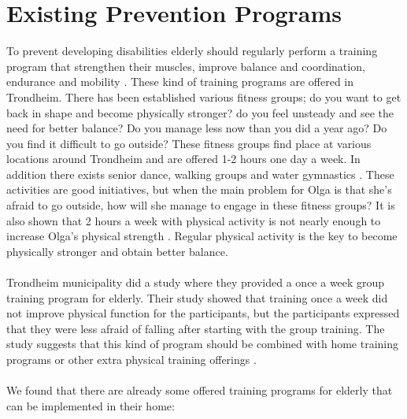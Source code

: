 \section{Existing Prevention Programs}
To prevent developing disabilities elderly should regularly perform a training program that strengthen their muscles, improve balance and coordination, endurance and mobility \cite{gruppetrening-trheim}. These kind of training programs are offered in Trondheim. There has been established various fitness groups; do you want to get back in shape and become physically stronger? do you feel unsteady and see the need for better balance? Do you manage less now than you did a year ago? Do you find it difficult to go outside? These fitness groups find place at various locations around Trondheim and are offered 1-2 hours one day a week. In addition there exists senior dance, walking groups and water gymnastics \cite{trim}. These activities are good initiatives, but when the main problem for Olga is that she's afraid to go outside, how will she manage to engage in these fitness groups? It is also shown that 2 hours a week with physical activity is not nearly enough to increase Olga’s physical strength \cite{gruppetrening-trheim}. Regular physical activity is the key to become physically stronger and obtain better balance. \\ \\
Trondheim municipality did a study where they provided a once a week group training program for elderly. Their study showed that training once a week did not improve physical function for the participants, but the participants expressed that they were less afraid of falling after starting with the group training. The study suggests that this kind of program should be combined with home training programs or other extra physical training offerings \cite{gruppetrening-trheim}. \\ \\
We found that there are already some offered training programs for elderly that can be implemented in their home:\\ \\

